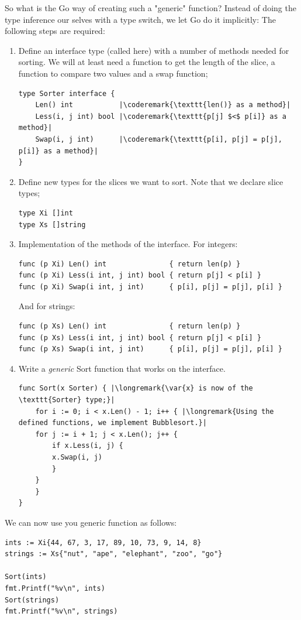 So what is the Go way of creating such a "generic" function? 
Instead of doing the type inference our selves with a type switch, we let
Go do it implicitly:
The following steps are required:
\begin{enumerate}
\item Define an interface type (called  here) with a number of 
methods needed for sorting.
We will at least need a function to get the length of the slice,
a function to compare two values and a swap function;
\begin{lstlisting}
type Sorter interface {
    Len() int           |\coderemark{\texttt{len()} as a method}|
    Less(i, j int) bool |\coderemark{\texttt{p[j] $<$ p[i]} as a method}|
    Swap(i, j int)      |\coderemark{\texttt{p[i], p[j] = p[j], p[i]} as a method}|
}
\end{lstlisting}
\item Define new types for the slices we want to sort. Note that we
declare slice types;
\begin{lstlisting}
type Xi []int
type Xs []string
\end{lstlisting}
\item Implementation of the methods of the  interface.
For integers:
\begin{lstlisting}
func (p Xi) Len() int               { return len(p) }
func (p Xi) Less(i int, j int) bool { return p[j] < p[i] }
func (p Xi) Swap(i int, j int)      { p[i], p[j] = p[j], p[i] }
\end{lstlisting}
And for strings:
\begin{lstlisting}
func (p Xs) Len() int               { return len(p) }
func (p Xs) Less(i int, j int) bool { return p[j] < p[i] }
func (p Xs) Swap(i int, j int)      { p[i], p[j] = p[j], p[i] }
\end{lstlisting}
\item Write a \emph{generic} Sort function that works on the  interface.
\begin{lstlisting}
func Sort(x Sorter) { |\longremark{\var{x} is now of the \texttt{Sorter} type;}|
    for i := 0; i < x.Len() - 1; i++ { |\longremark{Using the defined functions, we implement Bubblesort.}|
	for j := i + 1; j < x.Len(); j++ {
	    if x.Less(i, j) {
		x.Swap(i, j)
	    }
	}
    }
}
\end{lstlisting}
\showremarks
\end{enumerate}
We can now use you generic  function as follows:
\begin{lstlisting}
ints := Xi{44, 67, 3, 17, 89, 10, 73, 9, 14, 8}
strings := Xs{"nut", "ape", "elephant", "zoo", "go"}

Sort(ints)
fmt.Printf("%v\n", ints)
Sort(strings)
fmt.Printf("%v\n", strings)
\end{lstlisting}

